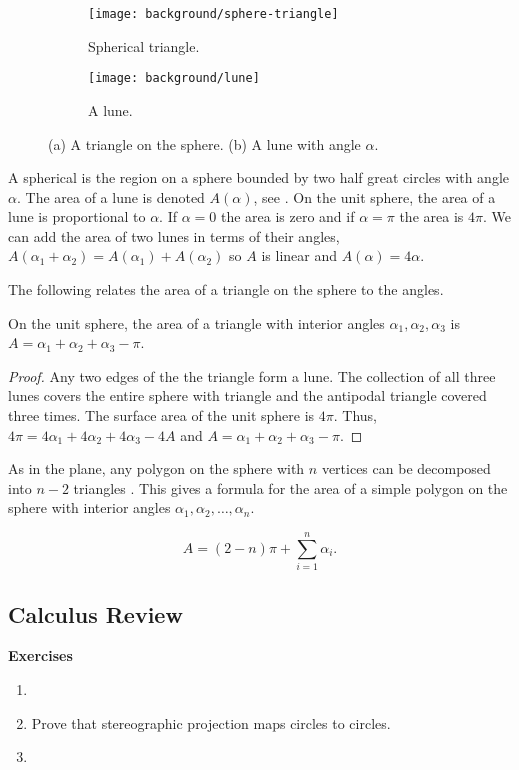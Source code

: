  \begin{figure}[htb]
         \centering
        \begin{subfigure}[b]{0.35\textwidth}
         \texttt{[image: background/sphere-triangle]}
         \caption{Spherical triangle.}
 	 \label{fig:sphere-triangle}
       \end{subfigure}
         \hspace{1cm}
         \begin{subfigure}[b]{0.35\textwidth}
         \texttt{[image: background/lune]}
         \caption{A lune.}
          \label{fig:lune}
         \end{subfigure}
		\caption{(a) A triangle on the sphere.
 		(b) A lune with angle $\alpha$.
 		\label{fig:sphere-lune}}
 \end{figure}
A spherical  is the region on a sphere bounded by two half great circles
with angle $\alpha$. The area of a lune is denoted $A(\alpha)$,
 see .
On the unit sphere, the area of a lune is proportional to $\alpha$. 
If $\alpha=0$ the area is zero and if $\alpha=\pi$ the area is $4\pi$.
We can add the area of two lunes in terms of their angles, 
$A(\alpha_1+\alpha_2)=A(\alpha_1)+A(\alpha_2)$ so $A$ is linear
and  $A(\alpha)=4\alpha.$




The following relates the area of a triangle on the sphere to the angles.

\begin{lemma}\label{lem:spherical-triangle}
On the unit sphere, the area of a triangle with interior angles $\alpha_1, \alpha_2, \alpha_3$
is $A=\alpha_1+\alpha_2+\alpha_3-\pi$.
\end{lemma}

\begin{proof}
	Any two edges of the the triangle form a lune. The collection of 
	all three lunes covers the entire sphere with triangle and the antipodal triangle covered three times.
 	The surface area of the unit sphere is $4\pi$.
	Thus, $4\pi=4\alpha_1+4\alpha_2+4\alpha_3-4A$
	and $A=\alpha_1+\alpha_2+\alpha_3-\pi$.
\end{proof}

As in the plane, any polygon on the sphere with $n$ vertices can be decomposed
into $n-2$ triangles \cite{orourke_computational_1994}. This gives a formula for the area of a simple polygon
on the sphere with interior angles $\alpha_1,\alpha_2,\ldots, \alpha_n$.

\begin{equation} \label{eqn:sphere-area}
	A=(2-n)\pi +\sum_{i=1}^n \alpha_i.
\end{equation}

\subsection{Calculus Review}

\noindent \textbf{Exercises}


\begin{enumerate}
	\item 
	
	\item Prove that stereographic projection maps circles to circles.
	
	\item 
	
\end{enumerate}

\pagebreak